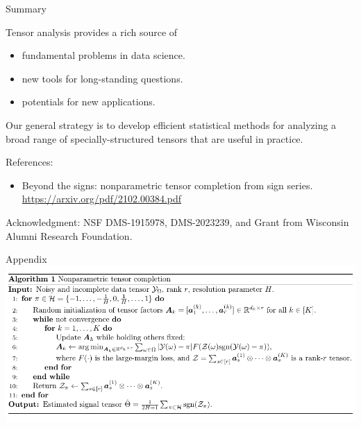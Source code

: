 \documentclass[10pt, mathserif]{beamer} %
\theoremstyle{definition}
\theoremstyle{plain}
\begin{document}
\begin{frame}{Summary}

Tensor analysis provides a rich source of
\begin{itemize}
\item fundamental problems in data science.
\item new tools for long-standing questions.
\item potentials for new applications.
\end{itemize}

\begin{block}{}
Our general strategy is to develop efficient statistical methods for analyzing a broad range of {\color{red}specially-structured tensors} that are useful in practice. 
\end{block}

References:
\begin{itemize}
\item {\color{blue}Beyond the signs: nonparametric tensor completion from sign series. \url{https://arxiv.org/pdf/2102.00384.pdf}}
\end{itemize}
\vspace{.2cm}
Acknowledgment: {\small NSF DMS-1915978, DMS-2023239, and Grant from Wisconsin Alumni Research Foundation.}
\end{frame}



\appendix
\begin{frame}{Appendix}
    \includegraphics[width = \textwidth]{Figures/algorithm.pdf}
\end{frame}
\end{document}
